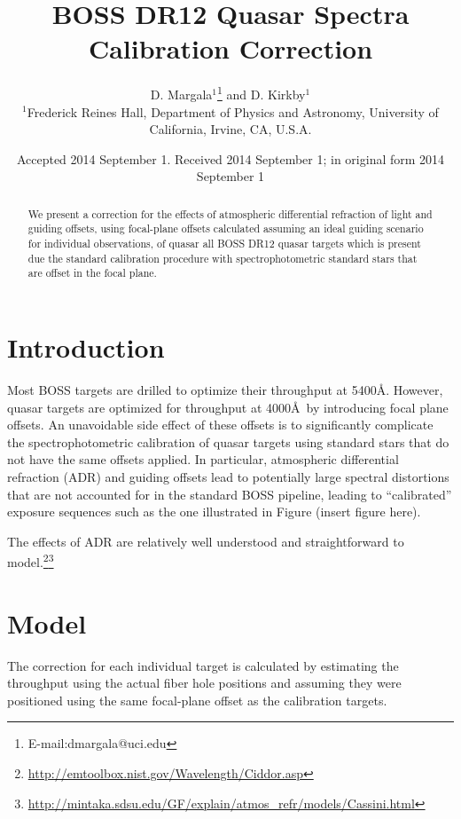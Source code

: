 \documentclass[useAMS,usenatbib]{mn2e}
\title[BOSS DR12 Quasar Spectra Calibration Correction]{BOSS DR12 Quasar Spectra Calibration Correction}
\author[D. Margala and D. Kirkby]{D. Margala$^{1}$\thanks{E-mail:dmargala@uci.edu} and D. Kirkby$^{1}$\\
$^{1}$Frederick Reines Hall, Department of Physics and Astronomy, University of California, Irvine, CA, U.S.A.}
\begin{document}
\date{Accepted 2014 September 1. Received 2014 September 1; in original form 2014 September 1}

\pagerange{\pageref{firstpage}--\pageref{lastpage}} 

\maketitle

\label{firstpage}

\begin{abstract}
We present a correction for the effects of atmospheric differential refraction of light and guiding offsets, using focal-plane offsets calculated assuming an ideal guiding scenario for individual observations, of quasar all BOSS DR12 quasar targets which is present due the standard calibration procedure with spectrophotometric standard stars that are offset in the focal plane.
\end{abstract}


\section{Introduction}

Most BOSS targets are drilled to optimize their throughput at 5400\AA. However, quasar targets are optimized for throughput at 4000\AA~by introducing focal plane offsets. An unavoidable side effect of these offsets is to significantly complicate the spectrophotometric calibration of quasar targets using standard stars that do not have the same offsets applied. In particular, atmospheric differential refraction (ADR) and guiding offsets lead to potentially large spectral distortions that are not accounted for in the standard BOSS pipeline, leading to ``calibrated'' exposure sequences such as the one illustrated in Figure (insert figure here).

The effects of ADR are relatively well understood and straightforward to model.\footnote{\url{http://emtoolbox.nist.gov/Wavelength/Ciddor.asp}}\footnote{\url{http://mintaka.sdsu.edu/GF/explain/atmos_refr/models/Cassini.html}}

\section{Model}

The correction for each individual target is calculated by estimating the throughput using the actual fiber hole positions and assuming they were positioned using the same focal-plane offset as the calibration targets.
\end{document}
